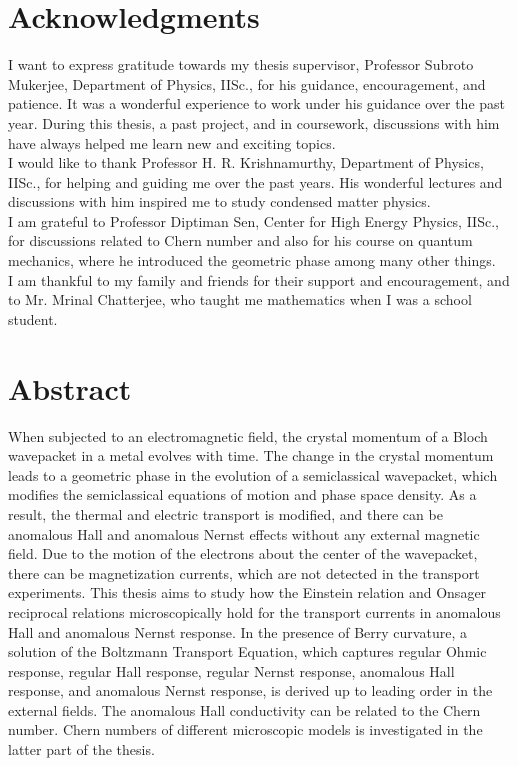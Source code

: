 \documentclass{report}
\begin{document}
\maketitle


\chapter*{\center Acknowledgments}%
%
I want to express gratitude towards my thesis supervisor, Professor Subroto Mukerjee, Department of Physics, IISc., for his guidance, encouragement, and patience. It was a wonderful experience to work under his guidance over the past year. During this thesis, a past project, and in coursework, discussions with him have always helped me learn new and exciting topics. \\

I would like to thank Professor H. R. Krishnamurthy, Department of Physics, IISc., for helping and guiding me over the past years. His wonderful lectures and discussions with him inspired me to study condensed matter physics.\\

I am grateful to Professor Diptiman Sen, Center for High Energy Physics, IISc., for discussions related to Chern number and also for his course on quantum mechanics, where he introduced the geometric phase among many other things.\\

I am thankful to my family and friends for their support and encouragement, and to Mr. Mrinal Chatterjee, who taught me mathematics when I was a school student.

\chapter*{\center Abstract}%
%
When subjected to an electromagnetic field, the crystal momentum of a Bloch wavepacket in a metal evolves with time. The change in the crystal momentum leads to a geometric phase in the evolution of a semiclassical wavepacket, which modifies the semiclassical equations of motion and phase space density. As a result, the thermal and electric transport is modified, and there can be anomalous Hall and anomalous Nernst effects without any external magnetic field. Due to the motion of the electrons about the center of the wavepacket, there can be magnetization currents, which are not detected in the transport experiments. This thesis aims to study how the Einstein relation and Onsager reciprocal relations microscopically hold for the transport currents in anomalous Hall and anomalous Nernst response. In the presence of Berry curvature, a solution of the Boltzmann Transport Equation, which captures regular Ohmic response, regular Hall response, regular Nernst response, anomalous Hall response, and anomalous Nernst response, is derived up to leading order in the external fields. The anomalous Hall conductivity can be related to the Chern number. Chern numbers of different microscopic models is investigated in the latter part of the thesis.
\end{document}
